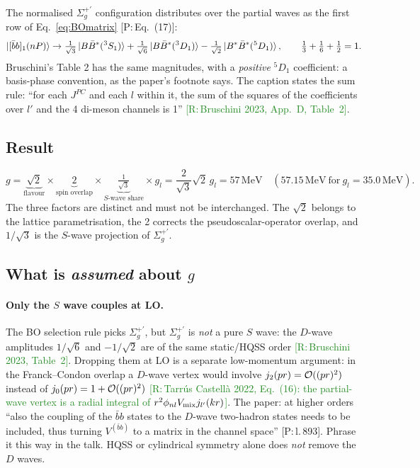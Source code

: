 \documentclass[11pt,a4paper]{article}
\newcommand{\tagP}[1]{\textcolor{blue!65!black}{\textsf{\small[P:\,#1]}}}
\newcommand{\tagR}[1]{\textcolor{ForestGreen}{\textsf{\small[R:\,#1]}}}
\newcommand{\BBst}{B\bar B^*}
\newcommand{\BstBst}{B^*\bar B^*}
\renewcommand{\VQQ}{V^{(\bar bb)}}
\renewcommand{\bbnP}{[\bar bb]_1(nP)}
\renewcommand{\MeV}{\,\mathrm{MeV}}
\begin{document}
The normalised $\Sigma_g^{+\prime}$ configuration distributes over the partial waves as the first row of Eq.~\eqref{eq:BOmatrix} \tagP{Eq.~(17)}:
\begin{equation}
\ket{\bbnP}\to\tfrac{1}{\sqrt3}\ket{\BBst(^3S_1)}+\tfrac{1}{\sqrt6}\ket{\BBst(^3D_1)}-\tfrac{1}{\sqrt2}\ket{\BstBst(^5D_1)},\qquad\tfrac13+\tfrac16+\tfrac12=1 .
\end{equation}
Bruschini's Table 2 has the same magnitudes, with a \emph{positive} $^5D_1$ coefficient: a basis-phase convention, as the paper's footnote says. The caption states the sum rule: ``for each $J^{PC}$ and each $l$ within it, the sum of the squares of the coefficients over $l'$ and the 4 di-meson channels is 1'' \tagR{Bruschini 2023, App.~D, Table~2}.

\subsection{Result}

\begin{keybox}
\begin{equation}
g=\underbrace{\sqrt2}_{\text{flavour}}\times\underbrace{2}_{\text{spin overlap}}\times\underbrace{\tfrac{1}{\sqrt3}}_{S\text{-wave share}}\times g_l=\frac{2}{\sqrt3}\sqrt2\,g_l=57\MeV\quad(57.15\MeV\ \text{for}\ g_l=35.0\MeV).
\end{equation}
The three factors are distinct and must not be interchanged. The $\sqrt2$ belongs to the lattice parametrisation, the 2 corrects the pseudoscalar-operator overlap, and $1/\sqrt3$ is the $S$-wave projection of $\Sigma_g^{+\prime}$.
\end{keybox}

\subsection{What is \emph{assumed} about $g$}
\label{sec:gassump}

\paragraph{Only the $S$ wave couples at LO.} The BO selection rule picks $\Sigma_g^{+\prime}$, but $\Sigma_g^{+\prime}$ is \emph{not} a pure $S$ wave: the $D$-wave amplitudes $1/\sqrt6$ and $-1/\sqrt2$ are of the same static/HQSS order \tagR{Bruschini 2023, Table~2}. Dropping them at LO is a separate low-momentum argument: in the Franck--Condon overlap a $D$-wave vertex would involve $j_2(pr)={\cal O}((pr)^2)$ instead of $j_0(pr)=1+{\cal O}((pr)^2)$ \tagR{Tarr\'us Castell\`a 2022, Eq.~(16): the partial-wave vertex is a radial integral of $r^2\phi_{nl}V_{\rm mix}j_{l'}(kr)$}. The paper: at higher orders ``also the coupling of the $\bar bb$ states to the $D$-wave two-hadron states needs to be included, thus turning $\VQQ$ to a matrix in the channel space'' \tagP{l.\,893}. Phrase it this way in the talk. HQSS or cylindrical symmetry alone does \emph{not} remove the $D$ waves.
\end{document}
